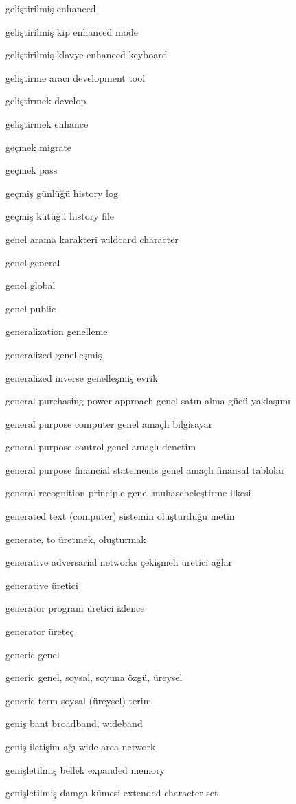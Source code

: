 \documentclass[12pt,fleqn]{article}\usepackage{../../common}
\begin{document}
geliştirilmiş enhanced

geliştirilmiş kip enhanced mode

geliştirilmiş klavye enhanced keyboard

geliştirme aracı development tool

geliştirmek develop

geliştirmek enhance

geçmek migrate

geçmek pass

geçmiş günlüğü history log

geçmiş kütüğü history file

genel arama karakteri wildcard character

genel general

genel global

genel public

generalization genelleme

generalized genelleşmiş

generalized inverse genelleşmiş evrik

general purchasing power approach genel satın alma gücü yaklaşımı

general purpose computer genel amaçlı bilgisayar

general purpose control genel amaçlı denetim

general purpose financial statements genel amaçlı finansal tablolar

general recognition principle genel muhasebeleştirme ilkesi

generated text (computer) sistemin oluşturduğu metin

generate, to üretmek, oluşturmak

generative adversarial networks çekişmeli üretici ağlar

generative üretici

generator program üretici izlence

generator üreteç

generic genel

generic genel, soysal, soyuna özgü, üreysel

generic term soysal (üreysel) terim

geniş bant broadband, wideband

geniş iletişim ağı wide area network

genişletilmiş bellek expanded memory

genişletilmiş damga kümesi extended character set
\end{document}
